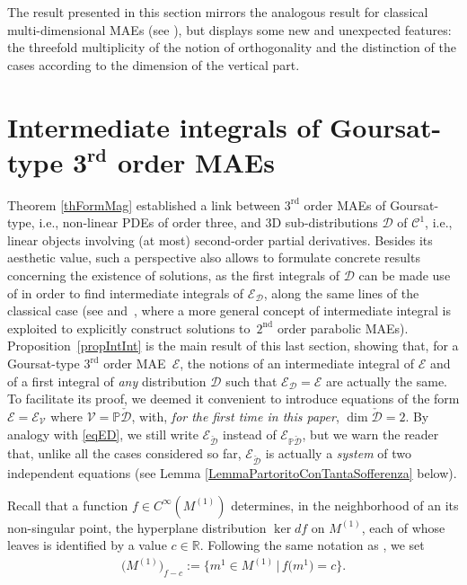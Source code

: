 \documentclass[10pt,a4paper]{amsart}
\newcommand{\R}{\mathbb{R}}
\newcommand{\C}{\mathcal{C}}
\newcommand{\D}{\mathcal{D}}
\newcommand{\M}{\mathcal{V}}
\newcommand{\E}{\mathcal{E}}
\renewcommand{\P}{\mathbb{P}}
\newcommand{\Rd}{^\textrm{rd}}
\newcommand{\Nd}{^\textrm{nd}}
\newcommand{\Ddue}{{\check{\mathcal{D}}}}
\numberwithin{equation}{section}
\begin{document}
The result presented in this section mirrors the analogous result for classical multi-dimensional MAEs (see \cite[Theorem~1]{MR2985508}), but displays some new and unexpected features: the threefold multiplicity of the notion of orthogonality and the distinction of the cases according to the dimension of the vertical part.

\section[Intermediate integrals of Goursat-type $3\Rd$ order MAEs]{Intermediate integrals of Goursat-type $\boldsymbol{3\Rd}$ order MAEs}\label{secIntInt}

Theorem \ref{thFormMag} established a link between $3\Rd$ order MAEs of Goursat-type, i.e., non-linear PDEs of order three, and 3D sub-distributions $\D$ of $\C^1$, i.e., linear objects involving (at most) second-order partial derivatives. Besides its aesthetic value, such a perspective also allows to formulate concrete results concerning the existence of solutions, as the f\/irst integrals of $\D$ can be made use of in order to f\/ind intermediate integrals of $\E_\D$, along the same lines of the classical case (see \cite[Section~6.3]{MR2985508} and~\cite{Alekseevsky2014144}, where a more general concept of intermediate integral is exploited to explicitly construct solutions to~$2\Nd$ order parabolic MAEs). Proposition~\ref{propIntInt} is the main result of this last section, showing that, for a Goursat-type $3\Rd$ order MAE~$\E$, the notions of an intermediate integral of $\E$ and of a f\/irst integral of \emph{any} distribution $\D$ such that $\E_\D=\E$ are actually the same. To facilitate its proof, we deemed it convenient to introduce equations of the form $\E=\E_\M$ where $\M=\P\Ddue$, with, \emph{for the first time in this paper}, $\dim\Ddue=2$. By analogy with \eqref{eqED}, we still write $\E_\Ddue$ instead of $\E_{\P\Ddue}$, but we warn the reader that, unlike all the cases considered so far, $\E_\Ddue$ is actually a \emph{system} of two independent equations (see Lemma \ref{LemmaPartoritoConTantaSofferenza} below).

Recall that a function $f\in C^\infty(M^{(1)})$ determines, in the neighborhood of an its non-singular point, the hyperplane distribution $\ker d f$ on $M^{(1)}$, each of whose leaves is identif\/ied by a value $c\in\R$. Following the same notation as \cite{MR2985508}, we set
\begin{gather*}
 \big(M^{(1)}\big)_{f-c}:=\big\{m^1\in M^{(1)}\,|\, f\big(m^1\big)=c\big\} .
\end{gather*}
\end{document}
